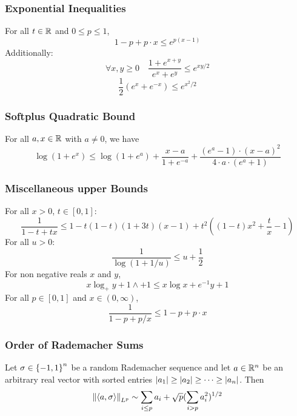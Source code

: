 \documentclass[10pt]{article}
\begin{document}
\subsubsection{Exponential Inequalities}
For all $t \in \mathbb{R}$ and $0 \leq p \leq 1$, 
\begin{equation}
    1-p + p \cdot x \leq e^{p (x-1)}
\end{equation}
Additionally:
\begin{equation}
    \forall x,y \geq 0  \quad \frac{1+e^{x+y}}{e^x + e^y} \leq e^{xy/2}
\end{equation}
\begin{equation}
    \frac{1}{2}(e^x + e^{-x}) \leq e^{x^2/2}
\end{equation}

\subsubsection{Softplus Quadratic Bound}
For all $a,x \in \mathbb{R}$ with $a \neq 0$, we have 
\begin{equation}
    \log(1+e^x) \leq \log(1+e^a) + \frac{x-a}{1+e^{-a}}+\frac{(e^a-1)\cdot(x-a)^2}{4\cdot a \cdot(e^a+1)}
\end{equation}

\subsubsection{Miscellaneous upper Bounds}
For all $x > 0$, $t \in [0,1]$:
\begin{equation}
    \frac{1}{1-t +t x} \leq 1- t(1-t)(1+3t)(x-1) + t^2 \left( (1-t)x^2 + \frac{t}{x} -1 \right)
\end{equation} 
For all $u > 0$:
\begin{equation}
    \frac{1}{\log (1 + 1/u)} \leq u + \frac{1}{2}
\end{equation}
For non negative reals $x$ and $y$, 
\begin{equation}
    x \log_+ y +1 \wedge +1 \leq x \log x + e^{-1} y + 1
\end{equation}
For all $p \in [0,1]$ and $x \in (0, \infty)$, 
\begin{equation}
    \frac{1}{1- p + p/x} \leq 1- p + p \cdot x 
\end{equation}
\subsubsection{Order of Rademacher Sums}
Let $\sigma \in \left\{ -1,1 \right\}^n$ be a random Rademacher sequence and let $a \in \mathbb{R}^n$ be an arbitrary real vector with sorted entries $\left|a_1\right| \geq \left|a_2\right| \geq \cdots \geq \left|a_n\right|$. Then 
\begin{equation}
    \left\lVert\left\langle a,\sigma \right\rangle\right\rVert_{L^p} \sim \sum_{i \leq p} a_i + \sqrt{p} (\sum_{i > p} a_i^2 )^{1/2} 
\end{equation}
\end{document}

